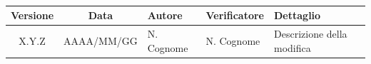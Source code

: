 \\[0.5cm]

\renewcommand{\arraystretch}{1.3}
\noindent\begin{tabularx}{\textwidth}{|c|c|>{\raggedright\arraybackslash}p{2.8cm}|>{\raggedright\arraybackslash}p{2.8cm}|X|}
    \hline
    \textbf{Versione} & \textbf{Data} & \textbf{Autore} & \textbf{Verificatore} & \textbf{Dettaglio} \\
    \hline
    X.Y.Z & AAAA/MM/GG & N. Cognome & N. Cognome & Descrizione della modifica \\
    \hline
\end{tabularx}
\newpage
